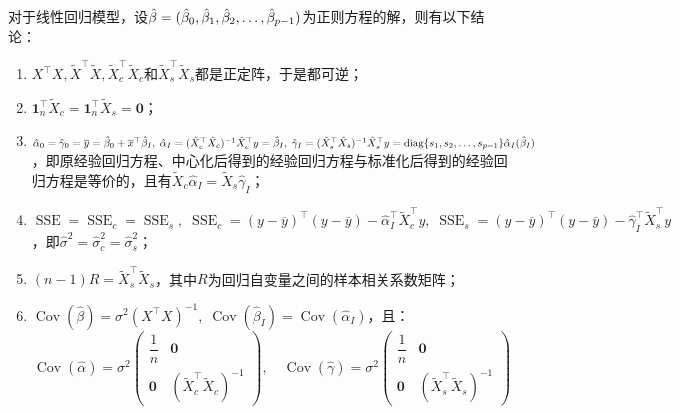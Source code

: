 \begin{theorem}\label{theo:LinearRegressionModel}
	对于线性回归模型，设$\hat{\beta}=(\hat{\beta}_0,\hat{\beta}_1, \hat{\beta}_2, \dots, \hat{\beta}_{p-1})$为正则方程的解，则有以下结论：
	\begin{enumerate}
		\item $X^{\top}X,\tilde{X}^{\top}\tilde{X},\tilde{X}_c^{\top}\tilde{X}_c$和$\tilde{X}_s^{\top}\tilde{X}_s$都是正定阵，于是都可逆；
		\item $\mathbf{1}_n^{\top}\tilde{X}_c=\mathbf{1}_n^{\top}\tilde{X}_s=\mathbf{0}$；
		\item $\hat{\alpha}_0=\hat{\gamma}_0=\overline{y}=\hat{\beta}_0+\overline{x}^{\top}\hat{\beta}_I,\;\hat{\alpha}_I=(\tilde{X}_c^{\top}\tilde{X}_c)^{-1}\tilde{X}_c^{\top}y=\hat{\beta}_I,\;\hat{\gamma}_I=(\tilde{X}_s^{\top}\tilde{X}_s)^{-1}\tilde{X}_s^{\top}y=\operatorname{diag}\{s_1, s_2, \dots, s_{p-1}\}\hat{\alpha}_I(\hat{\beta}_I)$，即原经验回归方程、中心化后得到的经验回归方程与标准化后得到的经验回归方程是等价的，且有$\tilde{X}_c\hat{\alpha}_I=\tilde{X}_s\hat{\gamma}_I$；
		\item $\operatorname{SSE}=\operatorname{SSE}_c=\operatorname{SSE}_s,\;\operatorname{SSE}_c=(y-\overline{y})^{\top}(y-\overline{y})-\hat{\alpha}_I^{\top}\tilde{X}_c^{\top}y,\;\operatorname{SSE}_s=(y-\overline{y})^{\top}(y-\overline{y})-\hat{\gamma}_I^{\top}\tilde{X}_s^{\top}y$，即$\hat{\sigma}^2=\hat{\sigma}_c^2=\hat{\sigma}_s^2$；
		\item $(n-1)R=\tilde{X}_s^{\top}\tilde{X}_s$，其中$R$为回归自变量之间的样本相关系数矩阵；
		\item $\operatorname{Cov}(\hat{\beta})=\sigma^2(X^{\top}X)^{-1},\;\operatorname{Cov}(\hat{\beta}_I)=\operatorname{Cov}(\hat{\alpha}_I)$，且：
		\begin{equation*}
			\operatorname{Cov}(\hat{\alpha})=\sigma^2
			\begin{pmatrix}
				\dfrac{1}{n} & \mathbf{0} \\
				\mathbf{0} & (\tilde{X}_c^{\top}\tilde{X}_c)^{-1}
			\end{pmatrix},\quad
			\operatorname{Cov}(\hat{\gamma})=\sigma^2
			\begin{pmatrix}
				\dfrac{1}{n} & \mathbf{0} \\
				\mathbf{0} & (\tilde{X}_s^{\top}\tilde{X}_s)^{-1}
			\end{pmatrix}
		\end{equation*}
	\end{enumerate}
\end{theorem}

